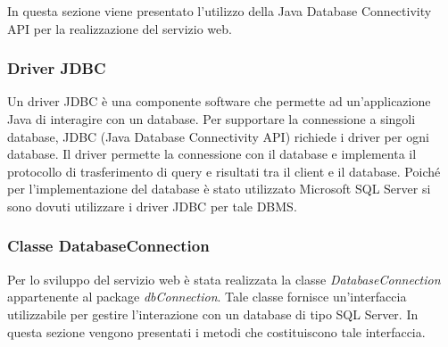 In questa sezione viene presentato l'utilizzo della Java Database Connectivity API per la realizzazione del servizio web.

\subsubsection{Driver JDBC}

Un driver JDBC è una componente software che permette ad un'applicazione Java di interagire con un database. Per supportare la connessione a singoli database, JDBC (Java Database Connectivity API) richiede i driver per ogni database. Il driver permette la connessione con il database e implementa il protocollo di trasferimento di query e risultati tra il client e il database. Poiché per l'implementazione del database è stato utilizzato Microsoft SQL Server si sono dovuti utilizzare i driver JDBC per tale DBMS.

\subsubsection{Classe DatabaseConnection} \label{dbConnect}

Per lo sviluppo del servizio web è stata realizzata la classe \textit{DatabaseConnection} appartenente al package \textit{dbConnection}. Tale classe fornisce un'interfaccia utilizzabile per gestire l'interazione con un database di tipo SQL Server. In questa sezione vengono presentati i metodi che costituiscono tale interfaccia.


